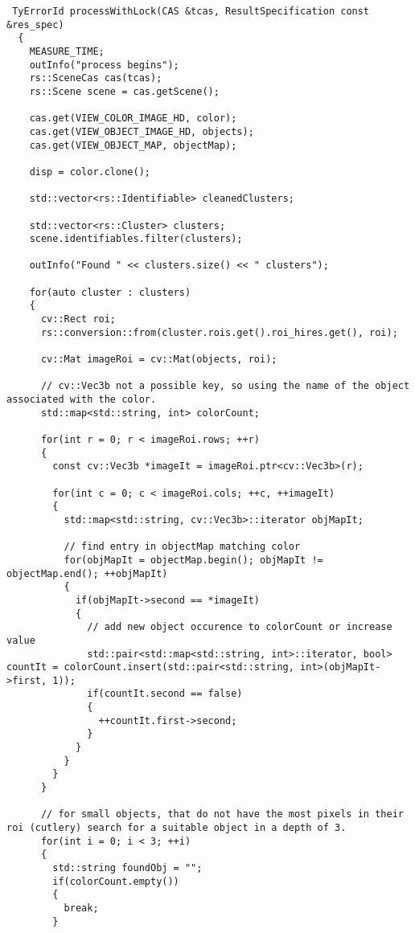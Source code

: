 \begin{algorithm}[H]
\begin{lstlisting}
 TyErrorId processWithLock(CAS &tcas, ResultSpecification const &res_spec)
  {
    MEASURE_TIME;
    outInfo("process begins");
    rs::SceneCas cas(tcas);
    rs::Scene scene = cas.getScene();

    cas.get(VIEW_COLOR_IMAGE_HD, color);
    cas.get(VIEW_OBJECT_IMAGE_HD, objects);
    cas.get(VIEW_OBJECT_MAP, objectMap);

    disp = color.clone();

    std::vector<rs::Identifiable> cleanedClusters;

    std::vector<rs::Cluster> clusters;
    scene.identifiables.filter(clusters);

    outInfo("Found " << clusters.size() << " clusters");

    for(auto cluster : clusters)
    {
      cv::Rect roi;
      rs::conversion::from(cluster.rois.get().roi_hires.get(), roi);

      cv::Mat imageRoi = cv::Mat(objects, roi);

      // cv::Vec3b not a possible key, so using the name of the object associated with the color.
      std::map<std::string, int> colorCount;

      for(int r = 0; r < imageRoi.rows; ++r)
      {
        const cv::Vec3b *imageIt = imageRoi.ptr<cv::Vec3b>(r);

        for(int c = 0; c < imageRoi.cols; ++c, ++imageIt)
        {
          std::map<std::string, cv::Vec3b>::iterator objMapIt;

          // find entry in objectMap matching color
          for(objMapIt = objectMap.begin(); objMapIt != objectMap.end(); ++objMapIt)
          {
            if(objMapIt->second == *imageIt)
            {
              // add new object occurence to colorCount or increase value
              std::pair<std::map<std::string, int>::iterator, bool> countIt = colorCount.insert(std::pair<std::string, int>(objMapIt->first, 1));
              if(countIt.second == false)
              {
                ++countIt.first->second;
              }
            }
          }
        }
      }

      // for small objects, that do not have the most pixels in their roi (cutlery) search for a suitable object in a depth of 3.
      for(int i = 0; i < 3; ++i)
      {
        std::string foundObj = "";
        if(colorCount.empty())
        {
          break;
        }


\end{lstlisting}
\end{algorithm}
